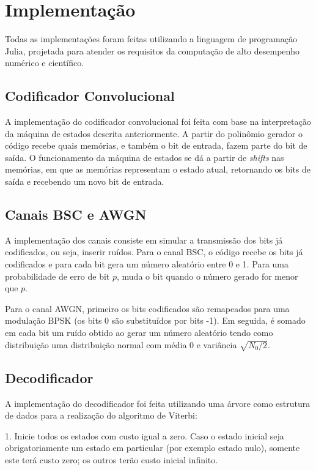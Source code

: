 \section{Implementação}

Todas as implementações foram feitas utilizando a linguagem de programação Julia, projetada para atender os requisitos da computação de alto desempenho numérico e científico.

\subsection{Codificador Convolucional}

A implementação do codificador convolucional foi feita com base na interpretação da máquina de estados descrita anteriormente. A partir do polinômio gerador o código recebe quais memórias, e também o bit de entrada, fazem parte do bit de saída. O funcionamento da máquina de estados se dá a partir de \textit{shifts} nas memórias, em que as memórias representam o estado atual, retornando os bits de saída e recebendo um novo bit de entrada.

\subsection{Canais BSC e AWGN}

A implementação dos canais consiste em simular a transmissão dos bits já codificados, ou seja, inserir ruídos. Para o canal BSC, o código recebe os bits já codificados e para cada bit gera um número aleatório entre 0 e 1. Para uma probabilidade de erro de bit $p$, muda o bit quando o número gerado for menor que $p$.

Para o canal AWGN, primeiro os bits codificados são remapeados para uma modulação BPSK (os bits 0 são substituídos por bits -1). Em seguida, é somado em cada bit um ruído obtido ao gerar um número aleatório tendo como distribuição uma distribuição normal com média 0 e variância $\sqrt{N_{0}/2}$.

\subsection{Decodificador}

A implementação do decodificador foi feita utilizando uma árvore como estrutura de dados para a realização do algoritmo de Viterbi:

1. Inicie todos os estados com custo igual a zero. Caso o estado inicial seja obrigatoriamente um estado em particular (por exemplo estado nulo), somente este terá custo zero; os outros terão custo inicial infinito.

